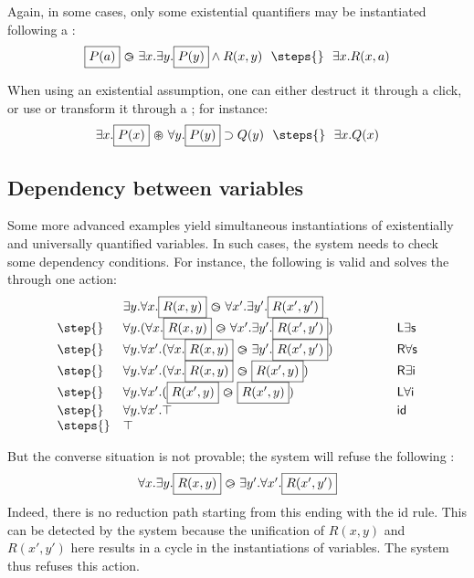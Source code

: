 Again, in some cases, only some existential quantifiers may be
instantiated following a :
$$
\begin{array}{rcl}
\select{P(a)}\back \exists x.\exists y. \select{P(y)}\land R(x,y)
 ~\/~\steps{}
~\/~
    \exists x. R(x,a)
\end{array}
$$

When using an existential assumption, one can either destruct it
through a click, or use or transform it through a ; for instance:
$$
\exists x.\select{P(x)}\forw \forall y.\select{P(y)}\limp
Q(y)  ~\/~\steps{}
~\/~\exists x.Q(x)
$$

\subsection{Dependency between variables}
Some more advanced examples yield simultaneous instantiations of
existentially and universally quantified variables. In such cases, the
system needs to check some dependency conditions. For instance, the
following  is valid and solves the  through one action:
$$
\begin{array}{lll}
  &\exists y. \forall x. \select{R(x,y)}\back \forall x'.\exists
    y'. \select{R(x',y')}& \\
  \step{}& \forall y.(\forall x. \select{R(x,y)}\back \forall x'.\exists
        y'. \select{R(x',y')} ) \mbox{\hbox to 12pt{\hfill}}& \mathsf{L}\exists\mathsf{s}\\
  \step{} &\forall y. \forall x'. (\forall x. \select{R(x,y)}\back \exists
  y'. \select{R(x',y')} ) ~~~~~~~~~~~~&\mathsf{R}\forall\mathsf{s}\\
  \step{} &  \forall y. \forall x'. (\forall
         x. \select{R(x,y)}\back\select{R(x',y)} )&\mathsf{R}\exists\mathsf{i}\\
  \step{}&   \forall y. \forall
           x'. (\select{R(x',y)}\back\select{R(x',y)} )&\mathsf{L}\forall\mathsf{i}\\
   \step{}  &  \forall y. \forall
           x'. \top & \mathsf{id}\\
\steps{}& \top
\end{array}
$$

But the converse situation is not provable; the system will refuse
the following :
$$
\begin{array}{rcl}
  \forall x. \exists y. \fbox{$R(x,y)$}\operatorname{\,\varogreaterthan\,} \exists y'.\forall x'. \fbox{$R(x',y')$}
\end{array}
$$
Indeed, there is no reduction path starting from this  ending with the
\textsf{id} rule. This can be detected by the system because the unification of
$R(x,y)$ and $R(x',y')$ here results in a cycle in the instantiations of
variables. The system thus refuses this action.

